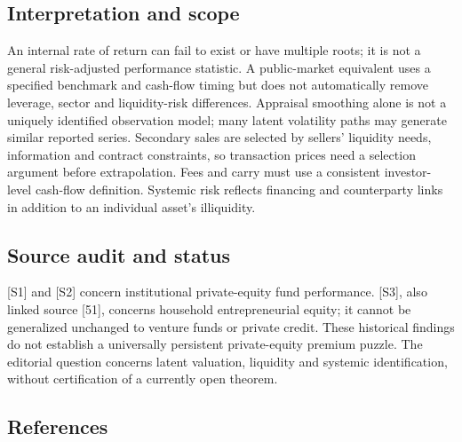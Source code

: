 \documentclass[11pt,a4paper]{article}
\begin{document}
\subsection*{Interpretation and scope}
An internal rate of return can fail to exist or have multiple roots; it is not a general risk-adjusted performance statistic. A public-market equivalent uses a specified benchmark and cash-flow timing but does not automatically remove leverage, sector and liquidity-risk differences. Appraisal smoothing alone is not a uniquely identified observation model; many latent volatility paths may generate similar reported series. Secondary sales are selected by sellers’ liquidity needs, information and contract constraints, so transaction prices need a selection argument before extrapolation. Fees and carry must use a consistent investor-level cash-flow definition. Systemic risk reflects financing and counterparty links in addition to an individual asset’s illiquidity.

\subsection*{Source audit and status}
[S1] and [S2] concern institutional private-equity fund performance. [S3], also linked source [51], concerns household entrepreneurial equity; it cannot be generalized unchanged to venture funds or private credit. These historical findings do not establish a universally persistent private-equity premium puzzle. The editorial question concerns latent valuation, liquidity and systemic identification, without certification of a currently open theorem.

\subsection*{References}
\end{document}
